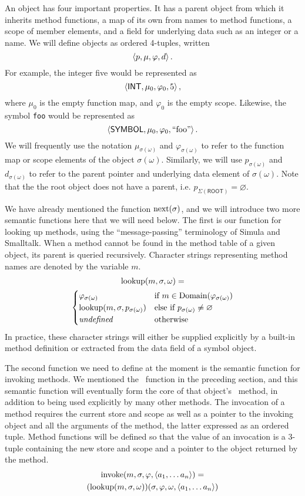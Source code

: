 \documentclass[twocolumn]{article}
\begin{document}
An object has four important properties. It has a parent object from
which it inherits method functions, a map of its own from names to
method functions, a scope of member elements, and a field for
underlying data such as an integer or a name. We will define objects
as ordered 4-tuples, written
\[ \left< p, \mu, \varphi, d \right> .\]
For example, the integer five would be represented as
\[ \left< \mathsf{INT}, \mu_0, \varphi_0, 5 \right>, \]
where $\mu_0$ is the empty function map, and $\varphi_0$ is the empty
scope. Likewise, the symbol \texttt{foo} would be represented as
\[ \left< \mathsf{SYMBOL}, \mu_0, \varphi_0, \text{``foo''} \right>. \] We
will frequently use the notation $\mu_{\sigma(\omega)}$ and
$\varphi_{\sigma(\omega)}$ to refer to the function map or scope
elements of the object $\sigma(\omega)$. Similarly, we will use
$p_{\sigma(\omega)}$ and $d_{\sigma(\omega)}$ to refer to the parent
pointer and underlying data element of $\sigma(\omega)$. Note that the
the root object does not have a parent, i.e.
$p_{\Sigma(\mathsf{ROOT})} = \varnothing$.

We have already mentioned the function $\operatorname{next}(\sigma)$, and we will
introduce two more semantic functions here that we will need
below. The first is our function for looking up methods, using the
``message-passing'' terminology of Simula and Smalltalk. When a method
cannot be found in the method table of a given object, its parent is
queried recursively. Character strings representing method names are
denoted by the variable $m$.
\begin{multline*} \operatorname{lookup}(m, \sigma, \omega) = \\
\begin{cases}
  \varphi_{\sigma(\omega)} &\text{if } m \in
  \operatorname{Domain}(\varphi_{\sigma(\omega)}) \\
  \operatorname{lookup}(m,\sigma,p_{\sigma(\omega)})
  &\text{else if }p_{\sigma(\omega)}\neq \varnothing\\
  \mathit{undefined} & \text {otherwise}
  \end{cases}
\end{multline*}
In practice, these character strings will either be supplied
explicitly by a built-in method definition or extracted from the data
field of a symbol object.

The second function we need to define at the moment is the semantic
function for invoking methods. We mentioned the \msg\ function in the
preceding section, and this semantic function will eventually form the
core of that object's \call\ method, in addition to being used
explicitly by many other methods. The invocation of a method requires
the current store and scope as well as a pointer to the invoking
object and all the arguments of the method, the latter expressed as an
ordered tuple. Method functions will be defined so that the value of
an invocation is a 3-tuple containing the new store and scope and a
pointer to the object returned by the method.
\begin{multline*}
  \operatorname{invoke}( m, \sigma, \varphi, \left< a_1,\ldots a_n\right>) = \\
  (\operatorname{lookup}(m, \sigma, \omega))(\sigma,\varphi,\omega,
  \left< a_1,\ldots a_n \right> )
\end{multline*}
  
\end{document}
